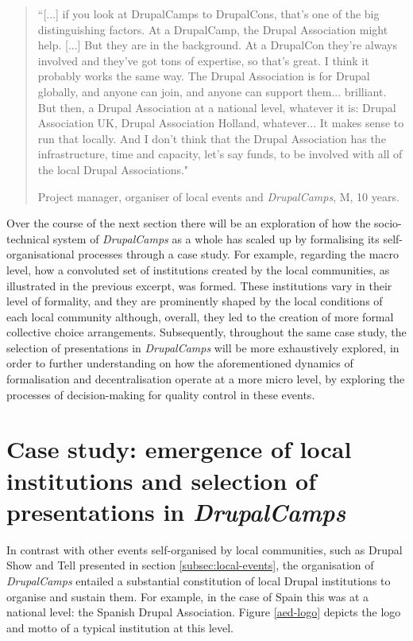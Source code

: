 \begin{quotation}
``[...] if you look at DrupalCamps to DrupalCons, that's one of the big distinguishing factors. At a DrupalCamp, the Drupal Association might help. [...] But they are in the background. At a DrupalCon they're always involved and they've got tons of expertise, so that's great. I think it probably works the same way. The Drupal Association is for Drupal globally, and anyone can join, and anyone can support them... brilliant. But then, a Drupal Association at a national level, whatever it is: Drupal Association UK, Drupal Association Holland, whatever... It makes sense to run that locally. And I don't think that the Drupal Association has the infrastructure, time and capacity, let's say funds, to be involved with all of the local Drupal Associations."

\begin{flushright}\footnotesize{Project manager, organiser of local events and \textit{DrupalCamps}, M, 10 years.}\end{flushright}
\end{quotation}

Over the course of the next section there will be an exploration of how the socio-technical system of \textit{DrupalCamps} as a whole has scaled up by formalising its self-organisational processes through a case study. For example, regarding the macro level, how a convoluted set of institutions created by the local communities, as illustrated in the previous excerpt, was formed. These institutions vary in their level of formality, and they are prominently shaped by the local conditions of each local community although, overall, they led to the creation of more formal collective choice arrangements. Subsequently, throughout the same case study, the selection of presentations in \textit{DrupalCamps} will be more exhaustively explored, in order to further understanding on how the aforementioned dynamics of formalisation and decentralisation operate at a more micro level, by exploring the processes of decision-making for quality control in these events.

\section{Case study: emergence of local institutions and selection of presentations in \textit{DrupalCamps}}
\label{subsec:dcamps-emergence-local-institutions}

In contrast with other events self-organised by local communities, such as Drupal Show and Tell presented in section \ref{subsec:local-events}, the organisation of \textit{DrupalCamps} entailed a substantial constitution of local Drupal institutions to organise and sustain them. For example, in the case of Spain this was at a national level:  the Spanish Drupal Association. Figure \ref{aed-logo} depicts the logo and motto of a typical institution at this level.

